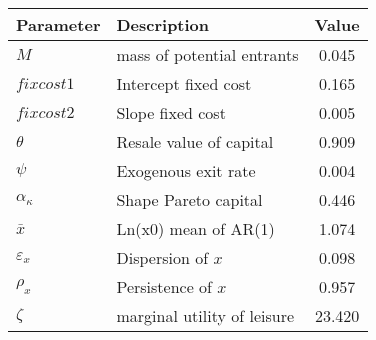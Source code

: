  \begin{tabular}{llc} \hline \hline 
 Parameter & Description & Value \\ 
 \hline 
$ M $  & mass of potential entrants &    0.045 \\ 
$ fixcost1  $  & Intercept fixed cost &    0.165 \\ 
$ fixcost2  $  & Slope fixed cost &    0.005 \\ 
$ \theta $  & Resale value of capital &    0.909 \\ 
$ \psi $  & Exogenous exit rate &    0.004 \\ 
$ \alpha_{\kappa}  $  & Shape Pareto capital &    0.446 \\ 
$ \bar{x}    $  & Ln(x0) mean of AR(1) &    1.074 \\ 
$ \varepsilon_x    $  & Dispersion of $x$ &    0.098 \\ 
$ \rho_x    $  & Persistence of $x$ &    0.957 \\ 
$ \zeta    $  & marginal utility of leisure &   23.420 \\ 
\hline \hline 
 \end{tabular} 
